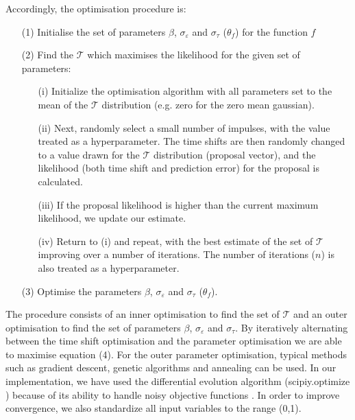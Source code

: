 \documentclass[11pt]{amsart}
\begin{document}
Accordingly, the optimisation procedure is:
\vspace{5mm} %

\begin{enumerate}
    \item [(1)] Initialise the set of parameters $\beta$, $\sigma_{\varepsilon}$ and $\sigma_{\tau}$ ($\theta_{f}$) for the function $f$
    \item [(2)] Find the $\mathcal{T}$ which maximises the likelihood for the given set of parameters:
        \begin{enumerate} 
            \item[(i)] Initialize the optimisation algorithm with all parameters set to the mean of the $\mathcal{T}$ distribution (e.g. zero for the zero mean gaussian). 
            \item[(ii)] Next, randomly select a small number of impulses, with the value treated as a hyperparameter. The time shifts are then randomly changed to a value drawn for the $\mathcal{T}$ distribution (proposal vector), and the likelihood (both time shift and prediction error) for the proposal is calculated. 
            \item[(iii)] If the proposal likelihood is higher than the current maximum likelihood, we update our estimate.
            \item [(iv)] Return to (i) and repeat, with the best estimate of the set of $\mathcal{T}$ improving over a number of iterations. The number of iterations ($n$) is also treated as a hyperparameter.
        \end{enumerate} 
    \item [(3)] Optimise the parameters $\beta$, $\sigma_{\varepsilon}$ and $\sigma_{\tau}$ ($\theta_{f}$).

\end{enumerate}
\vspace{5mm} %
The procedure consists of an inner optimisation to find the set of $\mathcal{T}$ and an outer optimisation to find the set of parameters $\beta$, $\sigma_{\varepsilon}$ and $\sigma_{\tau}$. 
By iteratively alternating between the time shift optimisation and the parameter optimisation we are able to maximise equation (4). 
For the outer parameter optimisation, typical methods such as gradient descent, genetic algorithms and annealing can be used.  In our implementation, we have used the differential evolution algorithm \cite{diff_ev} (scipiy.optimize \cite{scipy}) because of its ability to handle noisy objective functions \cite{diff_ev}. In order to improve convergence, we also standardize all input variables to the range (0,1).
\end{document}
